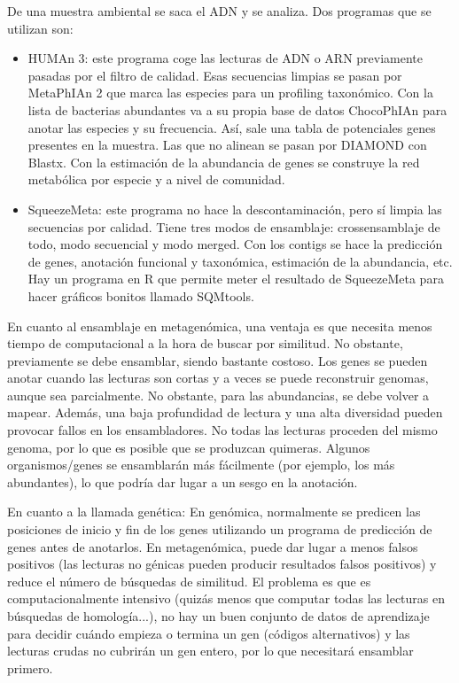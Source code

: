 De una muestra ambiental se saca el ADN y se analiza. Dos programas que se utilizan son:
\begin{itemize}
\item HUMAn 3: este programa coge las lecturas de ADN o ARN previamente pasadas por el filtro de calidad. Esas secuencias limpias se pasan por MetaPhIAn 2 que marca las especies para un profiling taxonómico. Con la lista de bacterias abundantes va a su propia base de datos ChocoPhIAn para anotar las especies y su frecuencia. Así, sale una tabla de potenciales genes presentes en la muestra. Las que no alinean se pasan por DIAMOND con Blastx. Con la estimación de la abundancia de genes se construye la red metabólica por especie y a nivel de comunidad.
\item SqueezeMeta: este programa no hace la descontaminación, pero sí limpia las secuencias por calidad. Tiene tres modos de ensamblaje: crossensamblaje de todo, modo secuencial y modo merged. Con los contigs se hace la predicción de genes, anotación funcional y taxonómica, estimación de la abundancia, etc. Hay un programa en R que permite meter el resultado de SqueezeMeta para hacer gráficos bonitos llamado SQMtools. 
\end{itemize}

En cuanto al ensamblaje en metagenómica, una ventaja es que necesita menos tiempo de computacional a la hora de buscar por similitud. No obstante, previamente se debe ensamblar, siendo bastante costoso. Los genes se pueden anotar cuando las lecturas son cortas y a veces se puede reconstruir genomas, aunque sea parcialmente. No obstante, para las abundancias, se debe volver a mapear. Además, una baja profundidad de lectura y una alta diversidad pueden provocar fallos en los ensambladores. No todas las lecturas proceden del mismo genoma, por lo que es posible que se produzcan quimeras. Algunos organismos/genes se ensamblarán más fácilmente (por ejemplo, los más abundantes), lo que podría dar lugar a un sesgo en la anotación.

En cuanto a la llamada genética:
En genómica, normalmente se predicen las posiciones de inicio y fin de los genes utilizando un programa de predicción de genes antes de anotarlos.
En metagenómica, puede dar lugar a menos falsos positivos (las lecturas no génicas pueden producir resultados falsos positivos) y reduce el número de búsquedas de similitud. El problema es que es computacionalmente intensivo (quizás menos que computar todas las lecturas en búsquedas de homología...), no hay un buen conjunto de datos de aprendizaje para decidir cuándo empieza o termina un gen (códigos alternativos) y las lecturas crudas no cubrirán un gen entero, por lo que necesitará ensamblar primero. 